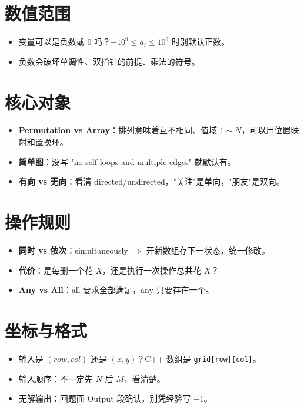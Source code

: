 \documentclass[UTF8,openany,oneside,zihao=-4]{ctexbook}
\begin{document}
\section{数值范围}

\begin{itemize}
  \item 变量可以是负数或 0 吗？$-10^9 \le a_i \le 10^9$ 时别默认正数。
  \item 负数会破坏单调性、双指针的前提、乘法的符号。
\end{itemize}

\section{核心对象}

\begin{itemize}
  \item \textbf{Permutation vs Array}：排列意味着互不相同、值域 $1 \sim N$，可以用位置映射和置换环。
  \item \textbf{简单图}：没写 "no self-loops and multiple edges" 就默认有。
  \item \textbf{有向 vs 无向}：看清 directed/undirected，"关注"是单向，"朋友"是双向。
\end{itemize}

\section{操作规则}

\begin{itemize}
  \item \textbf{同时 vs 依次}：simultaneously $\Rightarrow$ 开新数组存下一状态，统一修改。
  \item \textbf{代价}：是每删一个花 $X$，还是执行一次操作总共花 $X$？
  \item \textbf{Any vs All}：all 要求全部满足，any 只要存在一个。
\end{itemize}

\section{坐标与格式}

\begin{itemize}
  \item 输入是 $(row, col)$ 还是 $(x, y)$？C++ 数组是 \lstinline|grid[row][col]|。
  \item 输入顺序：不一定先 $N$ 后 $M$，看清楚。
  \item 无解输出：回题面 Output 段确认，别凭经验写 $-1$。
\end{itemize}
\end{document}
